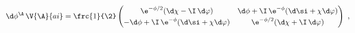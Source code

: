 \begin{equation}
  \d\phi^\A\, \V{\A}{ai} = \frc{1}{\2} \begin{pmatrix} \e^{-\phi/2}
  (\d\chi - \I\, \d\varphi) & \d\phi + \I\, \e^{-\phi} (\d\si + \chi
  \d\varphi) \\[2pt] - \d\phi + \I\, \e^{-\phi} (\d\si + \chi \d\varphi)
  & \e^{-\phi/2} (\d\chi + \I\, \d\varphi) \end{pmatrix}\ ,
 \end{equation}

